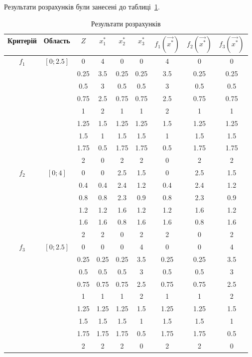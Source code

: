 Результати розрахунків були занесені до
таблиці~\ref{tab:result}.

        \begin{table}[H]        
            \caption{Результати розрахунків}
            \label{tab:result}
            \small
        \begin{tabular}{c|c|c|c c c|c c c}
            Критерій & Область & $Z$ & $x^*_1$ & $x^*_2$ & $x^*_3$ & $f_1(\vec{x^*})$ & $f_2(\vec{x^*})$ & $f_3(\vec{x^*})$ \\
            \hline

            \multirow{9}{*}{$f_1$} & \multirow{9}{*}{$[0;2.5]$} &
            0 & 4 & 0 & 0 & 4 & 0 & 0 \\
            & & 0.25 & 3.5 & 0.25 & 0.25 & 3.5 & 0.25 & 0.25 \\
            & & 0.5 & 3 & 0.5 & 0.5 & 3 & 0.5 & 0.5 \\
            & & 0.75 & 2.5 & 0.75 & 0.75 & 2.5 & 0.75 & 0.75 \\
            & & 1 & 2 & 1 & 1 & 2 & 1 & 1 \\
            & & 1.25 & 1.5 & 1.25 & 1.25 & 1.5 & 1.25 & 1.25 \\
            & & 1.5 & 1 & 1.5 & 1.5 & 1 & 1.5 & 1.5 \\
            & & 1.75 & 0.5 & 1.75 & 1.75 & 0.5 & 1.75 & 1.75 \\
            & & 2 & 0 & 2 & 2 & 0 & 2 & 2 \\
            \hline

            \multirow{6}{*}{$f_2$} & \multirow{6}{*}{$[0;4]$} &
            0 & 0 &  2.5& 1.5 &0 &  2.5 &1.5 \\
            & & 0.4& 0.4& 2.4& 1.2& 0.4& 2.4& 1.2 \\
            & & 0.8 &0.8& 2.3& 0.9& 0.8& 2.3& 0.9 \\
            & & 1.2 &1.2& 1.6& 1.2& 1.2& 1.6& 1.2 \\
            & & 1.6& 1.6& 0.8& 1.6& 1.6& 0.8& 1.6 \\ 
            & & 2  & 2  & 0 &  2  & 2  & 0  & 2 \\ 
            \hline 

            \multirow{9}{*}{$f_3$} & \multirow{9}{*}{$[0;2.5]$} &
            0  & 0 &  0  & 4 &  0 &  0 &  4 \\
            & & 0.25 &   0.25 &   0.25  &  3.5& 0.25  &  0.25 &   3.5 \\
            & & 0.5 &0.5& 0.5& 3 &  0.5& 0.5 &3 \\
            & & 0.75 &   0.75  &  0.75 &   2.5& 0.75  &  0.75&    2.5\\
            & & 1  & 1  & 1 &  2  & 1  & 1 &  2 \\
            & & 1.25  &  1.25 &   1.25  &  1.5 &1.25  &  1.25  &  1.5 \\
            & & 1.5& 1.5& 1.5& 1 &  1.5& 1.5 &1 \\
            & & 1.75 &   1.75 &   1.75 &   0.5 &1.75 &   1.75  &  0.5 \\
            & & 2 &  2  & 2  & 0  & 2 &  2  & 0 \\

        \end{tabular}
        \end{table}
